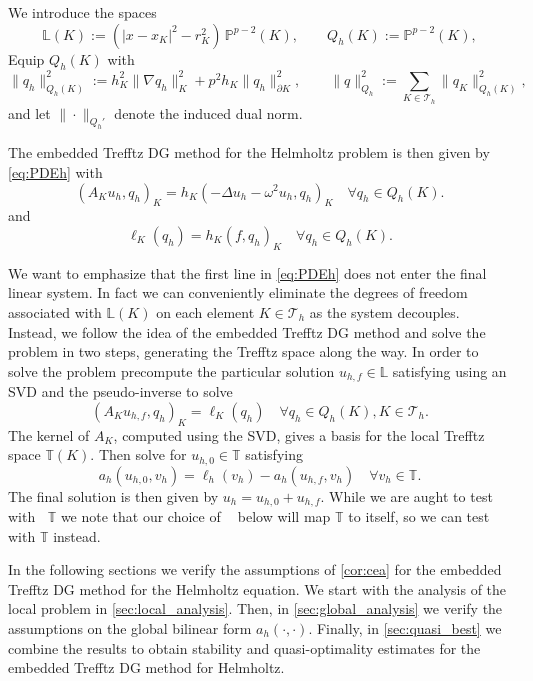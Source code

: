 \documentclass[11pt]{article}
\theoremstyle{definition}
\theoremstyle{plain}
\newcommand{\Th}{{\calT_h}}
\newcommand{\ILh}{\mathbb{L}}
\newcommand{\LKh}{\mathbb{L}(K)}
\newcommand{\QKh}{Q_h(K)}
\newcommand{\Qh}{Q_h}
\DeclareMathOperator{\tch}{T_h}
\newcommand{\inner}[1]{( #1 )}
\newcommand{\IP}{\mathbb{P}}
\newcommand{\ITh}{\mathbb{T}}
\newcommand{\calT}{\mathcal{T}}
\begin{document}
We introduce the spaces
\begin{equation}\label{eq:LKQK}
    \LKh := (|x-x_K|^2-r_K^2)\,\IP^{p-2}(K),\qquad \QKh:=\IP^{p-2}(K),
\end{equation}
Equip $\QKh$ with
\[
    \|q_h\|_{\QKh}^2 := h_K^{2}\|\nabla q_h\|_{K}^2 + p^{2} h_K \|q_h\|_{\partial K}^2,
\qquad
\|q\|_{\Qh}^2 := \sum_{K\in\Th}\|q_K\|_{\QKh}^2,
\]
and let $\|\cdot\|_{\Qh'}$ denote the induced dual norm.


The embedded Trefftz DG method for the Helmholtz problem is then given by \eqref{eq:PDEh} with
\begin{equation}\label{eq:AK}
    \inner{A_{K} u_h, q_h}_K = h_K\inner{-\Delta u_h-\omega^2 u_h, q_h}_{K} \quad \forall q_h\in \QKh.
\end{equation}
and 
\begin{equation}\label{eq:lK}
    \ell_K(q_h) = h_K\inner{f, q_h}_K \quad \forall q_h\in \QKh.
\end{equation}

We want to emphasize that the first line in \eqref{eq:PDEh} does not enter the final linear system. 
In fact we can conveniently eliminate the degrees of freedom associated with $\LKh$ on each element $K\in\Th$ as the system decouples.
Instead, we follow the idea of the embedded Trefftz DG method \cite{LS_IJMNE_2023} and solve the problem in two steps, generating the Trefftz space along the way.
In order to solve the problem precompute the particular solution $u_{h,f}\in \ILh$ satisfying using an SVD and the pseudo-inverse to solve
\begin{equation}\label{eq:particular}
    \inner{A_{K} u_{h,f}, q_h}_K = \ell_K(q_h) \quad \forall q_h\in \QKh, K\in\Th.
\end{equation}
The kernel of $A_{K}$, computed using the SVD, gives a basis for the local Trefftz space $\ITh(K)$.
Then solve for $u_{h,0}\in\ITh$ satisfying
\begin{equation}\label{eq:homogeneous}
    a_h(u_{h,0},v_h) = \ell_h(v_h) - a_h(u_{h,f},v_h) \quad \forall v_h\in \ITh.
\end{equation}
The final solution is then given by $u_h = u_{h,0} + u_{h,f}$.
While we are aught to test with $\tch\ITh$ we note that our choice of $\tch$ below will map $\ITh$ to itself, so we can test with $\ITh$ instead.

In the following sections we verify the assumptions of \cref{cor:cea} for the embedded Trefftz DG method for the Helmholtz equation.
We start with the analysis of the local problem in \cref{sec:local_analysis}.
Then, in \cref{sec:global_analysis} we verify the assumptions on the global bilinear form $a_h(\cdot,\cdot)$.
Finally, in \cref{sec:quasi_best} we combine the results to obtain stability and quasi-optimality estimates for the embedded Trefftz DG method for Helmholtz.
\end{document}
